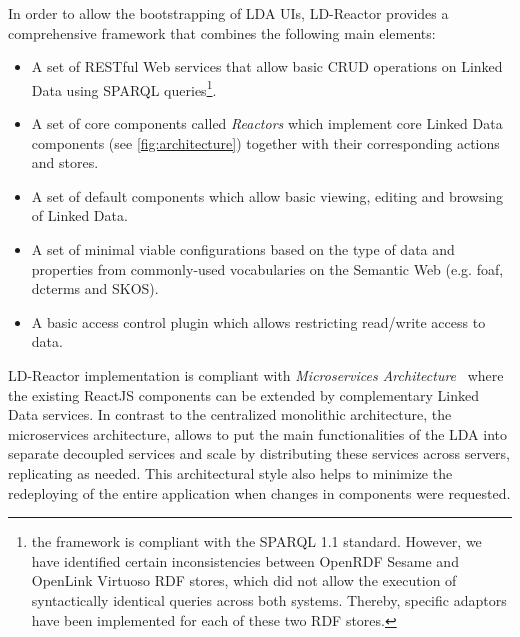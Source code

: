 \documentclass{acm_proc_article-sp}
\begin{document}
In order to allow the bootstrapping of LDA UIs, LD-Reactor provides a comprehensive framework that combines the following main elements:
\begin{itemize}

\item A set of RESTful Web services that allow basic CRUD operations on Linked Data using SPARQL queries\footnote{the framework is compliant with the SPARQL 1.1 standard. However, we have identified certain inconsistencies between OpenRDF Sesame and OpenLink Virtuoso RDF stores, which did not allow the execution of syntactically identical queries across both systems. Thereby, specific adaptors have been implemented for each of these two RDF stores.}.

\item A set of core components called \emph{Reactors} which implement core Linked Data components (see \autoref{fig:architecture}) together with their corresponding actions and stores.

\item A set of default components which allow basic viewing, editing and browsing of Linked Data.

\item A set of minimal viable configurations based on the type of data and properties from commonly-used vocabularies on the Semantic Web (e.g. foaf, dcterms and SKOS).

\item A basic access control plugin which allows restricting read/write access to data.

\end{itemize}

%

LD-Reactor implementation is compliant with \emph{Microservices Architecture}~\cite{microservices} where the existing ReactJS components can be extended by complementary Linked Data services.
In contrast to the centralized monolithic architecture, the microservices architecture, allows to put the main functionalities of the LDA into separate decoupled services and scale by distributing these services across servers, replicating as needed.
This architectural style also helps to minimize the redeploying of the entire application when changes in components were requested.
\end{document}
